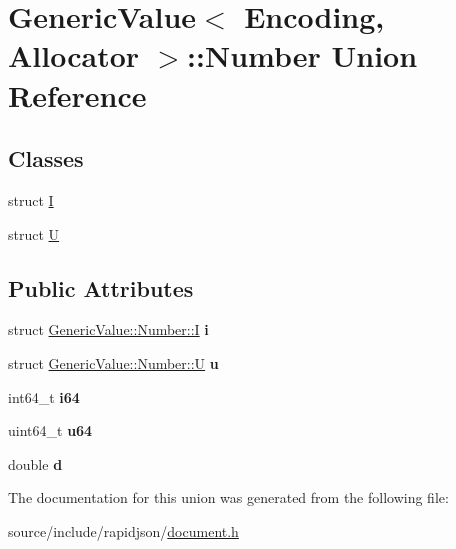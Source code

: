 \hypertarget{union_generic_value_1_1_number}{}\section{Generic\+Value$<$ Encoding, Allocator $>$\+:\+:Number Union Reference}
\label{union_generic_value_1_1_number}
\subsection*{Classes}
\begin{DoxyCompactItemize}
\item 
struct \hyperlink{struct_generic_value_1_1_number_1_1_i}{I}
\item 
struct \hyperlink{struct_generic_value_1_1_number_1_1_u}{U}
\end{DoxyCompactItemize}
\subsection*{Public Attributes}
\begin{DoxyCompactItemize}
\item 
\hypertarget{union_generic_value_1_1_number_a0593fffc72a240979606668179e94436}{}struct \hyperlink{struct_generic_value_1_1_number_1_1_i}{Generic\+Value\+::\+Number\+::\+I} {\bfseries i}\label{union_generic_value_1_1_number_a0593fffc72a240979606668179e94436}

\item 
\hypertarget{union_generic_value_1_1_number_a3b5f0986718c830b88d641491248131d}{}struct \hyperlink{struct_generic_value_1_1_number_1_1_u}{Generic\+Value\+::\+Number\+::\+U} {\bfseries u}\label{union_generic_value_1_1_number_a3b5f0986718c830b88d641491248131d}

\item 
\hypertarget{union_generic_value_1_1_number_ae53d96a8ead92099541da3b71633b77b}{}int64\+\_\+t {\bfseries i64}\label{union_generic_value_1_1_number_ae53d96a8ead92099541da3b71633b77b}

\item 
\hypertarget{union_generic_value_1_1_number_a1c8d3c6d226cf74315e233b30b622430}{}uint64\+\_\+t {\bfseries u64}\label{union_generic_value_1_1_number_a1c8d3c6d226cf74315e233b30b622430}

\item 
\hypertarget{union_generic_value_1_1_number_a7ca3ad492fff303586d241eb0d17c242}{}double {\bfseries d}\label{union_generic_value_1_1_number_a7ca3ad492fff303586d241eb0d17c242}

\end{DoxyCompactItemize}


The documentation for this union was generated from the following file\+:\begin{DoxyCompactItemize}
\item 
source/include/rapidjson/\hyperlink{document_8h}{document.\+h}\end{DoxyCompactItemize}
